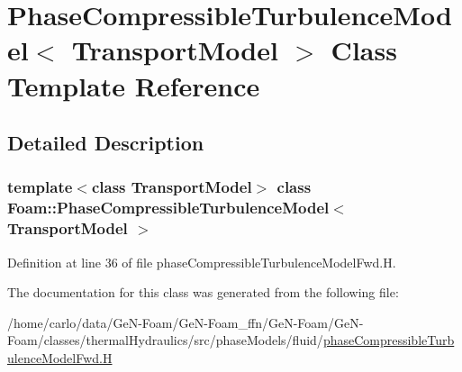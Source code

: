 \hypertarget{classFoam_1_1PhaseCompressibleTurbulenceModel}{}\section{Phase\+Compressible\+Turbulence\+Model$<$ Transport\+Model $>$ Class Template Reference}
\label{classFoam_1_1PhaseCompressibleTurbulenceModel}


\subsection{Detailed Description}
\subsubsection*{template$<$class Transport\+Model$>$\newline
class Foam\+::\+Phase\+Compressible\+Turbulence\+Model$<$ Transport\+Model $>$}



Definition at line 36 of file phase\+Compressible\+Turbulence\+Model\+Fwd.\+H.



The documentation for this class was generated from the following file\+:\begin{DoxyCompactItemize}
\item 
/home/carlo/data/\+Ge\+N-\/\+Foam/\+Ge\+N-\/\+Foam\+\_\+ffn/\+Ge\+N-\/\+Foam/\+Ge\+N-\/\+Foam/classes/thermal\+Hydraulics/src/phase\+Models/fluid/\hyperlink{phaseCompressibleTurbulenceModelFwd_8H}{phase\+Compressible\+Turbulence\+Model\+Fwd.\+H}\end{DoxyCompactItemize}
